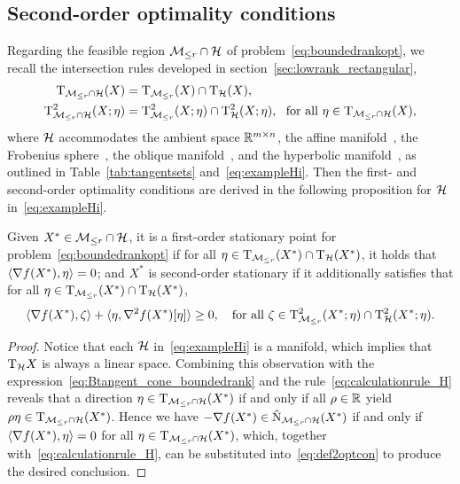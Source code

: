 \subsection{Second-order optimality conditions}\label{sec:SOCMH}
Regarding the feasible region $\mathcal{M}_{\le r}\cap\mathcal{H}$ of problem~\eqref{eq:boundedrankopt}, we recall the intersection rules developed in section~\ref{sec:lowrank_rectangular},
\begin{equation}\label{eq:calculationrule_H}
    \begin{aligned}
        \tangent_{\boundedrank\cap\hanifold}(X)&=\tangent_{\boundedrank}(X)\cap\tangent_{\hanifold}(X),
        \\
        \tangenttwo_{\boundedrank\cap\hanifold}(X;\eta)&=\tangenttwo_{\boundedrank}(X;\eta)\cap\tangenttwo_{\hanifold}(X;\eta),\ \ \text{for all}\ \eta\in\tangent_{\boundedrank\cap\hanifold}(X),
    \end{aligned}
\end{equation}
where $\mathcal{H}$ accommodates the ambient space $\mathbb{R}^{m\times n}$, the affine manifold~\cite{li2023normalboundedaffine}, the Frobenius sphere~\cite{cason2013iterative,yang2025spacedecouple}, the oblique manifold~\cite{yang2025spacedecouple}, and the hyperbolic manifold~\cite{jawanpuria2019lowrankhyperbolic}, as outlined in Table~\ref{tab:tangentsets} and~\eqref{eq:exampleHi}. Then the first- and second-order optimality conditions are derived in the following proposition for $\mathcal{H}$ in~\eqref{eq:exampleHi}.



\begin{proposition}\label{pro:2order_opt_H}
     Given $X^*\in\mathcal{M}_{\le r}\cap\mathcal{H}$, it is a first-order stationary point for problem~\eqref{eq:boundedrankopt} if for all $\eta\in\mathrm{T}_{\mathcal{M}_{\le r}}(X^*)\cap\mathrm{T}_{\mathcal{H}}(X^*)$, it holds that $\langle {\nabla f(X^*),\eta} \rangle=0$; and $X^*$ is second-order stationary if it additionally satisfies that for all $\eta\in\mathrm{T}_{\mathcal{M}_{\le r}}(X^*)\cap\mathrm{T}_{\mathcal{H}}(X^*)$,
     \begin{equation*}
        \innerp{\nabla f(X^*),\zeta}+\innerp{\eta,\nabla^2 f(X^*)[\eta]} \ge 0,\quad\text{for all}\ \zeta\in\tangenttwo_{\boundedrank}(X^*;\eta)\cap\tangenttwo_{\hanifold}(X^*;\eta).
    \end{equation*}
\end{proposition}
\begin{proof}
    Notice that each $\mathcal{H}$ in~\eqref{eq:exampleHi} is a manifold, which implies that $\mathrm{T}_{\mathcal{H}} X$ is always a linear space. Combining this observation with the expression~\eqref{eq:Btangent_cone_boundedrank} and the rule~\eqref{eq:calculationrule_H} reveals that a direction $\eta\in\mathrm{T}_{\mathcal{M}_{\le r}\cap\mathcal{H}}(X^*)$ if and only if all $\rho\in\mathbb{R}$ yield $\rho\eta\in\mathrm{T}_{\mathcal{M}_{\le r}\cap\mathcal{H}}(X^*)$. Hence we have $-\nabla f(X^*)\in\hat{\mathrm{N}}_{\mathcal{M}_{\le r}\cap\mathcal{H}}(X^*)$ if and only if $\langle {\nabla f(X^*),\eta} \rangle=0$ for all $\eta\in\mathrm{T}_{\mathcal{M}_{\le r}\cap\mathcal{H}}(X^*)$, which, together with~\eqref{eq:calculationrule_H}, can be substituted into~\eqref{eq:def2optcon} to produce the desired conclusion.
\end{proof}

